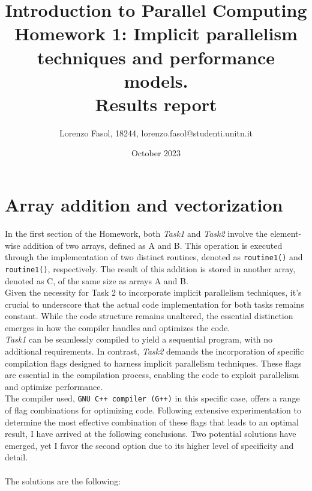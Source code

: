 \documentclass{article}
\begin{document}
\title{Introduction to Parallel Computing\\
    Homework 1: Implicit parallelism techniques and performance models.\\
    \textbf{Results report}
}
\author{Lorenzo Fasol, 18244, lorenzo.fasol@studenti.unitn.it}
\date{October 2023}
\maketitle

\section{Array addition and vectorization}
In the first section of the Homework, both \textit{Task1} and \textit{Task2} involve the element-wise addition of two arrays, defined as A and B. This operation is executed through the implementation of two distinct routines, denoted as \texttt{routine1()} and \texttt{routine1()}, respectively. The result of this addition is stored in another array, denoted as C, of the same size as arrays A and B.\\
Given the necessity for Task 2 to incorporate implicit parallelism techniques, it's crucial to underscore that the actual code implementation for both tasks remains constant. While the code structure remains unaltered, the essential distinction emerges in how the compiler handles and optimizes the code.\\
\textit{Task1} can be seamlessly compiled to yield a sequential program, with no additional requirements. In contrast, \textit{Task2} demands the incorporation of specific compilation flags designed to harness implicit parallelism techniques. These flags are essential in the compilation process, enabling the code to exploit parallelism and optimize performance.\\
The compiler used, \texttt{GNU C++ compiler (G++)} in this specific case, offers a range of flag combinations for optimizing code. Following extensive experimentation to determine the most effective combination of these flags that leads to an optimal result, I have arrived at the following conclusions. Two potential solutions have emerged, yet I favor the second option due to its higher level of specificity and detail.\\\\
The solutions are the following:
\end{document}
